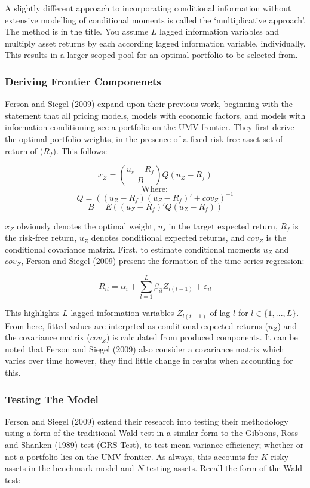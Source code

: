\documentclass[11pt, english]{article}
\begin{document}
	A slightly different approach to incorporating conditional information without extensive modelling of conditional moments is called the `multiplicative approach'. The method is in the title. You assume $L$ lagged information variables and multiply asset returns by each according lagged information variable, individually. This results in a larger-scoped pool for an optimal portfolio to be selected from.

		\subsubsection*{Deriving Frontier Componenets}

	Ferson and Siegel (2009) expand upon their previous work, beginning with the statement that all pricing models, models with economic factors, and models with information conditioning see a portfolio on the UMV frontier. They first derive the optimal portfolio weights, in the presence of a fixed risk-free asset set of return of ($R_f$). This follows:

	$$x_Z=\left(\frac{u_s-R_f}{B}\right)Q(u_Z-R_f)$$
	$$\mathrm{Where:}$$
	$$Q=\left((u_Z-R_f)(u_Z-R_f)'+cov_Z\right)^{-1}$$
	$$B=E\left((u_Z-R_f)'Q(u_Z-R_f)\right)$$

	$x_Z$ obviously denotes the optimal weight, $u_s$ in the target expected return, $R_f$ is the risk-free return, $u_Z$ denotes conditional expected returns, and $cov_Z$ is the conditional covariance matrix. First, to estimate conditional moments $u_Z$ and $cov_Z$, Ferson and Siegel (2009) present the formation of the time-series regression:

	$$R_{it}=\alpha_i+\sum_{l=1}^L\beta_{il}Z_{l(t-1)}+\varepsilon_{it}$$

	This highlights $L$ lagged information variables $Z_{l(t-1)}$ of lag $l$ for $l\in\{1,...,L\}$. From here, fitted values are interprted as conditional expected returns ($u_Z$) and the covariance matrix ($cov_Z$) is calculated from produced components. It can be noted that Ferson and Siegel (2009) also consider a covariance matrix which varies over time however, they find little change in results when accounting for this.

		\subsubsection*{Testing The Model}

	Ferson and Siegel (2009) extend their research into testing their methodology using a form of the traditional Wald test in a similar form to the Gibbons, Ross and Shanken (1989) test (GRS Test), to test mean-variance efficiency; whether or not a portfolio lies on the UMV frontier. As always, this accounts for $K$ risky assets in the benchmark model and $N$ testing assets. Recall the form of the Wald test:
\end{document}
